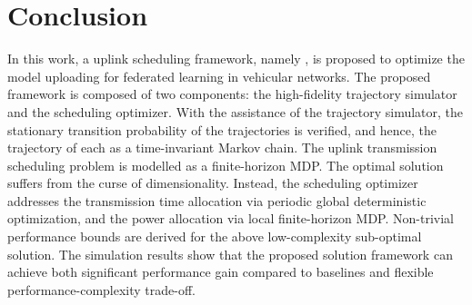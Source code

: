 \section{Conclusion}
\label{sec:conclusion}
In this work, a uplink scheduling framework, namely {\fwName}, is proposed to optimize the model uploading for federated learning in vehicular networks.
The proposed {\fwName} framework is composed of two components: the high-fidelity trajectory simulator and the scheduling optimizer.
With the assistance of the trajectory simulator, the stationary transition probability of the trajectories is verified, and hence, the trajectory of each {\IAV} as a time-invariant Markov chain.
The uplink transmission scheduling problem is modelled as a finite-horizon MDP.
The optimal solution suffers from the curse of dimensionality. Instead, the scheduling optimizer addresses the transmission time allocation via periodic global deterministic optimization, and the power allocation via local finite-horizon MDP. Non-trivial performance bounds are derived for the above low-complexity sub-optimal solution.
The simulation results show that the proposed solution framework can achieve both significant performance gain  compared to baselines and flexible performance-complexity trade-off.
